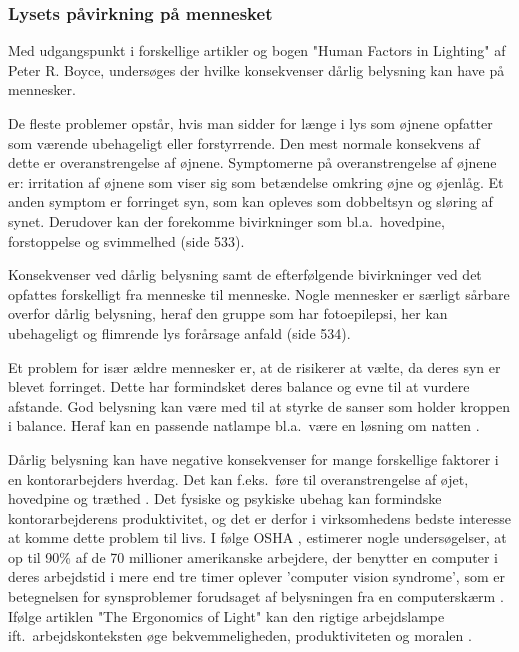 \subsubsection{Lysets påvirkning på mennesket} 
\label{sec:konsekvenser}

Med udgangspunkt i forskellige artikler og bogen "Human Factors in Lighting" af Peter R. Boyce, undersøges der hvilke konsekvenser dårlig belysning kan have på mennesker. 

De fleste problemer opstår, hvis man sidder for længe i lys som øjnene opfatter som værende ubehageligt eller forstyrrende. Den mest normale konsekvens af dette er overanstrengelse af øjnene. Symptomerne på overanstrengelse af øjnene er: irritation af øjnene som viser sig som betændelse omkring øjne og øjenlåg. Et anden symptom er forringet syn, som kan opleves som dobbeltsyn og sløring af synet. Derudover kan der forekomme bivirkninger som bl.a.\ hovedpine, forstoppelse og svimmelhed \cite{human_factors}(side 533).

Konsekvenser ved dårlig belysning samt de efterfølgende bivirkninger ved det opfattes forskelligt fra menneske til menneske. Nogle mennesker er særligt sårbare overfor dårlig belysning, heraf den gruppe som har fotoepilepsi, her kan ubehageligt og flimrende lys forårsage anfald \cite{human_factors}(side 534). 

Et problem for især ældre mennesker er, at de risikerer at vælte, da deres syn er blevet forringet. Dette har formindsket deres balance og evne til at vurdere afstande. God belysning kan være med til at styrke de sanser som holder kroppen i balance. Heraf kan en passende natlampe bl.a.\ være en løsning om natten \cite{human_factors}. 

Dårlig belysning kan have negative konsekvenser for mange forskellige faktorer i en kontorarbejders hverdag. Det kan f.eks.\ føre til overanstrengelse af øjet, hovedpine og træthed \cite{ergonomi_arbejdsplads}. Det fysiske og psykiske ubehag kan formindske kontorarbejderens produktivitet, og det er derfor i virksomhedens bedste interesse at komme dette problem til livs. I følge OSHA \cite{OSHA}, estimerer nogle undersøgelser, at op til 90\% af de 70 millioner amerikanske arbejdere, der benytter en computer i deres arbejdstid i mere end tre timer oplever 'computer vision syndrome', som er betegnelsen for synsproblemer forudsaget af belysningen fra en computerskærm \cite{CVS}. Ifølge artiklen "The Ergonomics of Light" kan den rigtige arbejdslampe ift.\ arbejdskonteksten øge bekvemmeligheden, produktiviteten og moralen \cite{ergonomi_arbejdsplads}. 